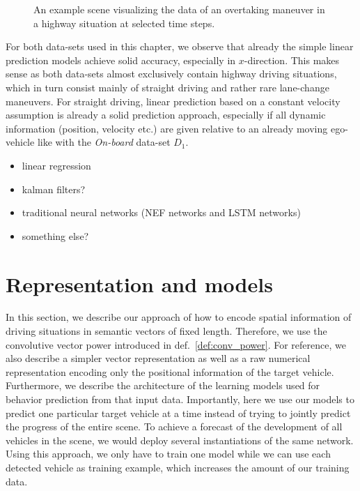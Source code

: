 \begin{figure}[H]
{	}
	\vspace{-0.3cm}
	\caption{An example scene visualizing the data of an overtaking maneuver in a highway situation at selected time steps.} \label{fig:overtaking}
\end{figure}

For both data-sets used in this chapter, we observe that already the simple linear prediction models achieve solid accuracy, especially in $x$-direction.
This makes sense as both data-sets almost exclusively contain highway driving situations, which in turn consist mainly of straight driving and rather rare lane-change maneuvers.
For straight driving, linear prediction based on a constant velocity assumption is already a solid prediction approach, especially if all dynamic information (position, velocity etc.) are given relative to an already moving ego-vehicle like with the \emph{On-board} data-set $D_1$.


\begin{itemize}
	\item linear regression
	\item kalman filters?
	\item traditional neural networks (\ac{NEF} networks and \ac{LSTM} networks)
	\item something else?
\end{itemize}

\section{Representation and models}
\label{sec:repr_models}

In this section, we describe our approach of how to encode spatial information of driving situations in semantic vectors of fixed length.
Therefore, we use the convolutive vector power introduced in def.~\ref{def:conv_power}.
For reference, we also describe a simpler vector representation as well as a raw numerical representation encoding only the positional information of the target vehicle.  
Furthermore, we describe the architecture of the learning models used for behavior prediction from that input data.
Importantly, here we use our models to predict one particular target vehicle at a time instead of trying to jointly predict the progress of the entire scene.
To achieve a forecast of the development of all vehicles in the scene, we would deploy several instantiations of the same network.
Using this approach, we only have to train one model while we can use each detected vehicle as training example, which increases the amount of our training data. 


